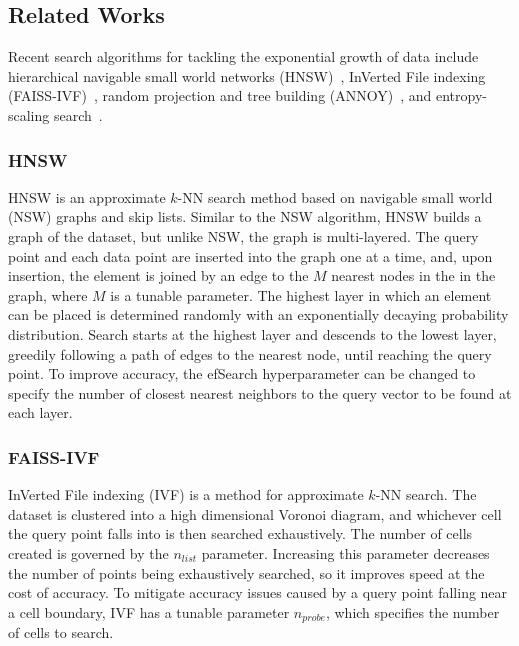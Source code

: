 \subsection{Related Works}
\label{sec:intoduction:related-works}

Recent search algorithms for tackling the exponential growth of data include hierarchical navigable small world networks (HNSW)~\cite{Malkov2016EfficientAR}, InVerted File indexing (FAISS-IVF)~\cite{faissivf}, random projection and tree building (ANNOY)~\cite{annoy}, and entropy-scaling search~\cite{yu2015entropy, ishaq2019clustered}.


\subsubsection{HNSW}
\label{sec:introduction:related-works:hnsw}

HNSW is an approximate $k$-NN search method based on navigable small world (NSW) graphs and skip lists. 
Similar to the NSW algorithm, HNSW builds a graph of the dataset, but unlike NSW, the graph is multi-layered.
The query point and each data point are inserted into the graph one at a time, and, upon insertion, the element is joined by an edge to the $M$ nearest nodes in the in the graph, where $M$ is a tunable parameter. 
The highest layer in which an element can be placed is determined randomly with an exponentially decaying probability distribution.
Search starts at the highest layer and descends to the lowest layer, greedily following a path of edges to the nearest node, until reaching the query point. 
To improve accuracy, the efSearch hyperparameter can be changed to specify the number of closest nearest neighbors to the query vector to be found at each layer. 


\subsubsection{FAISS-IVF}
\label{sec:introduction:related-works:faiss-ivf}

InVerted File indexing (IVF) is a method for approximate $k$-NN search. 
The dataset is clustered into a high dimensional Voronoi diagram, and whichever cell the query point falls into is then searched exhaustively.
The number of cells created is governed by the $n_{list}$ parameter. 
Increasing this parameter decreases the number of points being exhaustively searched, so it improves speed at the cost of accuracy.
To mitigate accuracy issues caused by a query point falling near a cell boundary, IVF has a tunable parameter $n_{probe}$, which specifies the number of cells to search.


